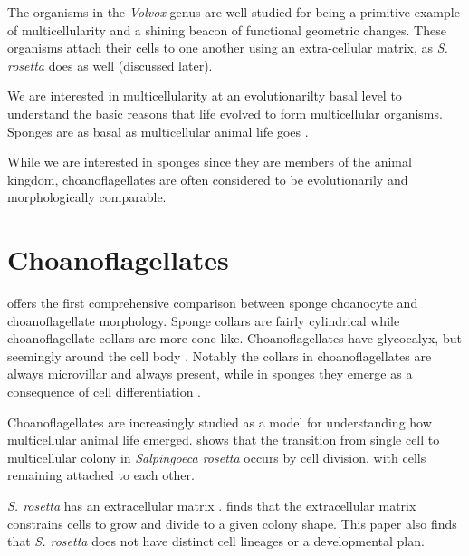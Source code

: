 The organisms in the \textit{Volvox} genus are well studied for being a primitive example of multicellularity and a shining beacon of functional geometric changes. These organisms attach their cells to one another using an extra-cellular matrix, as \textit{S. rosetta} does as well (discussed later). 

We are interested in multicellularity at an evolutionarilty basal level to understand the basic reasons that life evolved to form multicellular organisms. Sponges are as basal as multicellular animal life goes . 

While we are interested in sponges since they are members of the animal kingdom, choanoflagellates are often considered to be evolutionarily and morphologically comparable. 



\section{Choanoflagellates} %


\citet{mah2014} offers the first comprehensive comparison between sponge choanocyte and choanoflagellate morphology. Sponge collars are fairly cylindrical while choanoflagellate collars are more cone-like. Choanoflagellates have glycocalyx, but seemingly around the cell body \citep{leadbeater2008}. Notably the collars in choanoflagellates are always microvillar and always present, while in sponges they emerge as a consequence of cell differentiation .  

Choanoflagellates are increasingly studied as a model for understanding how multicellular animal life emerged. \citet{fairclough2010} shows that the transition from single cell to multicellular colony in \textit{Salpingoeca rosetta} occurs by cell division, with cells remaining attached to each other. 

\textit{S. rosetta} has an extracellular matrix \citep{larson2020}. \citet{larson2020} finds that the extracellular matrix constrains cells to grow and divide to a given colony shape. This paper also finds that \textit{S. rosetta} does not have distinct cell lineages or a developmental plan.

